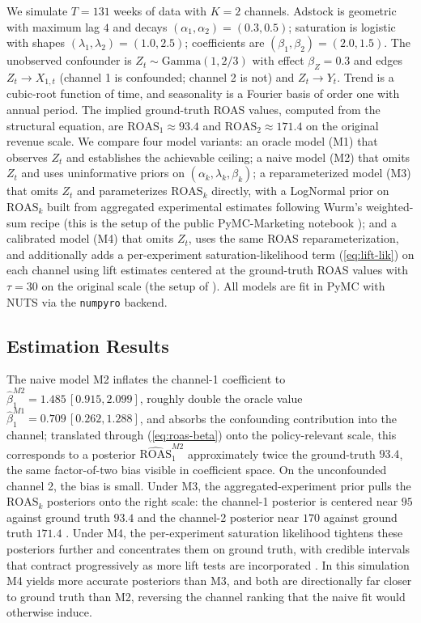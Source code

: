 \documentclass{uai2026} %
\newcommand{\ROAS}{\mathrm{ROAS}}
\begin{document}
We simulate $T=131$ weeks of data with $K=2$ channels.
Adstock is geometric with maximum lag $4$ and decays $(\alpha_1, \alpha_2) = (0.3, 0.5)$; saturation is logistic with shapes $(\lambda_1, \lambda_2) = (1.0, 2.5)$; coefficients are $(\beta_1, \beta_2) = (2.0, 1.5)$.
The unobserved confounder is $Z_t \sim \mathrm{Gamma}(1, 2/3)$ with effect $\beta_Z = 0.3$ and edges $Z_t \to X_{1,t}$ (channel 1 is confounded; channel 2 is not) and $Z_t \to Y_t$.
Trend is a cubic-root function of time, and seasonality is a Fourier basis of order one with annual period.
The implied ground-truth ROAS values, computed from the structural equation, are $\ROAS_1 \approx 93.4$ and $\ROAS_2 \approx 171.4$ on the original revenue scale.
We compare four model variants: an oracle model (M1) that observes $Z_t$ and establishes the achievable ceiling; a naive model (M2) that omits $Z_t$ and uses uninformative priors on $(\alpha_k, \lambda_k, \beta_k)$; a reparameterized model (M3) that omits $Z_t$ and parameterizes $\ROAS_k$ directly, with a LogNormal prior on $\ROAS_k$ built from aggregated experimental estimates following Wurm's weighted-sum recipe (this is the setup of the public PyMC-Marketing notebook \citealp{pymcmarketing_mmm_roas_parametrization}); and a calibrated model (M4) that omits $Z_t$, uses the same ROAS reparameterization, and additionally adds a per-experiment saturation-likelihood term (\ref{eq:lift-lik}) on each channel using lift estimates centered at the ground-truth ROAS values with $\tau = 30$ on the original scale (the setup of \citealp{pymcmarketing_mmm_roas}).
All models are fit in PyMC with NUTS via the \texttt{numpyro} backend.

\subsection{Estimation Results}\label{sec:estimation}

The naive model M2 inflates the channel-1 coefficient to $\hat\beta_1^{M2} = 1.485\,[0.915, 2.099]$, roughly double the oracle value $\hat\beta_1^{M1} = 0.709\,[0.262, 1.288]$, and absorbs the confounding contribution into the channel; translated through (\ref{eq:roas-beta}) onto the policy-relevant scale, this corresponds to a posterior $\widehat{\ROAS}_1^{M2}$ approximately twice the ground-truth $93.4$, the same factor-of-two bias visible in coefficient space.
On the unconfounded channel 2, the bias is small.
Under M3, the aggregated-experiment prior pulls the $\ROAS_k$ posteriors onto the right scale: the channel-1 posterior is centered near $95$ against ground truth $93.4$ and the channel-2 posterior near $170$ against ground truth $171.4$ \citep{pymcmarketing_mmm_roas_parametrization}.
Under M4, the per-experiment saturation likelihood tightens these posteriors further and concentrates them on ground truth, with credible intervals that contract progressively as more lift tests are incorporated \citep{pymcmarketing_mmm_roas}.
In this simulation M4 yields more accurate posteriors than M3, and both are directionally far closer to ground truth than M2, reversing the channel ranking that the naive fit would otherwise induce.
\end{document}
